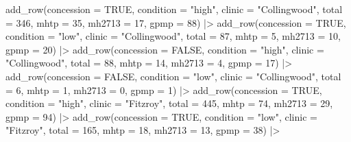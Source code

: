 \documentclass[
  letterpaper,
  DIV=11,
  numbers=noendperiod,
  oneside]{scrartcl}
\newenvironment{Shaded}{\begin{snugshade}}{\end{snugshade}}
\newcommand{\AttributeTok}[1]{\textcolor[rgb]{0.40,0.45,0.13}{#1}}
\newcommand{\ConstantTok}[1]{\textcolor[rgb]{0.56,0.35,0.01}{#1}}
\newcommand{\DecValTok}[1]{\textcolor[rgb]{0.68,0.00,0.00}{#1}}
\newcommand{\FunctionTok}[1]{\textcolor[rgb]{0.28,0.35,0.67}{#1}}
\newcommand{\NormalTok}[1]{\textcolor[rgb]{0.00,0.23,0.31}{#1}}
\newcommand{\SpecialCharTok}[1]{\textcolor[rgb]{0.37,0.37,0.37}{#1}}
\newcommand{\StringTok}[1]{\textcolor[rgb]{0.13,0.47,0.30}{#1}}
\begin{document}
\begin{Shaded}
\begin{Highlighting}[]
  \FunctionTok{add\_row}\NormalTok{(}\AttributeTok{concession =} \ConstantTok{TRUE}\NormalTok{, }\AttributeTok{condition =} \StringTok{"high"}\NormalTok{, }\AttributeTok{clinic =} \StringTok{"Collingwood"}\NormalTok{, }\AttributeTok{total =} \DecValTok{346}\NormalTok{, }\AttributeTok{mhtp =} \DecValTok{35}\NormalTok{, }\AttributeTok{mh2713 =} \DecValTok{17}\NormalTok{, }\AttributeTok{gpmp =} \DecValTok{88}\NormalTok{) }\SpecialCharTok{|\textgreater{}}
  \FunctionTok{add\_row}\NormalTok{(}\AttributeTok{concession =} \ConstantTok{TRUE}\NormalTok{, }\AttributeTok{condition =} \StringTok{"low"}\NormalTok{, }\AttributeTok{clinic =} \StringTok{"Collingwood"}\NormalTok{, }\AttributeTok{total =} \DecValTok{87}\NormalTok{, }\AttributeTok{mhtp =} \DecValTok{5}\NormalTok{, }\AttributeTok{mh2713 =} \DecValTok{10}\NormalTok{, }\AttributeTok{gpmp =} \DecValTok{20}\NormalTok{) }\SpecialCharTok{|\textgreater{}}
  \FunctionTok{add\_row}\NormalTok{(}\AttributeTok{concession =} \ConstantTok{FALSE}\NormalTok{, }\AttributeTok{condition =} \StringTok{"high"}\NormalTok{, }\AttributeTok{clinic =} \StringTok{"Collingwood"}\NormalTok{, }\AttributeTok{total =} \DecValTok{88}\NormalTok{, }\AttributeTok{mhtp =} \DecValTok{14}\NormalTok{, }\AttributeTok{mh2713 =} \DecValTok{4}\NormalTok{, }\AttributeTok{gpmp =} \DecValTok{17}\NormalTok{) }\SpecialCharTok{|\textgreater{}}
  \FunctionTok{add\_row}\NormalTok{(}\AttributeTok{concession =} \ConstantTok{FALSE}\NormalTok{, }\AttributeTok{condition =} \StringTok{"low"}\NormalTok{, }\AttributeTok{clinic =} \StringTok{"Collingwood"}\NormalTok{, }\AttributeTok{total =} \DecValTok{6}\NormalTok{, }\AttributeTok{mhtp =} \DecValTok{1}\NormalTok{, }\AttributeTok{mh2713 =} \DecValTok{0}\NormalTok{, }\AttributeTok{gpmp =} \DecValTok{1}\NormalTok{) }\SpecialCharTok{|\textgreater{}}
  \FunctionTok{add\_row}\NormalTok{(}\AttributeTok{concession =} \ConstantTok{TRUE}\NormalTok{, }\AttributeTok{condition =} \StringTok{"high"}\NormalTok{, }\AttributeTok{clinic =} \StringTok{"Fitzroy"}\NormalTok{, }\AttributeTok{total =} \DecValTok{445}\NormalTok{, }\AttributeTok{mhtp =} \DecValTok{74}\NormalTok{, }\AttributeTok{mh2713 =} \DecValTok{29}\NormalTok{, }\AttributeTok{gpmp =} \DecValTok{94}\NormalTok{) }\SpecialCharTok{|\textgreater{}}
  \FunctionTok{add\_row}\NormalTok{(}\AttributeTok{concession =} \ConstantTok{TRUE}\NormalTok{, }\AttributeTok{condition =} \StringTok{"low"}\NormalTok{, }\AttributeTok{clinic =} \StringTok{"Fitzroy"}\NormalTok{, }\AttributeTok{total =} \DecValTok{165}\NormalTok{, }\AttributeTok{mhtp =} \DecValTok{18}\NormalTok{, }\AttributeTok{mh2713 =} \DecValTok{13}\NormalTok{, }\AttributeTok{gpmp =} \DecValTok{38}\NormalTok{) }\SpecialCharTok{|\textgreater{}}

\end{Highlighting}
\end{Shaded}
\end{document}
